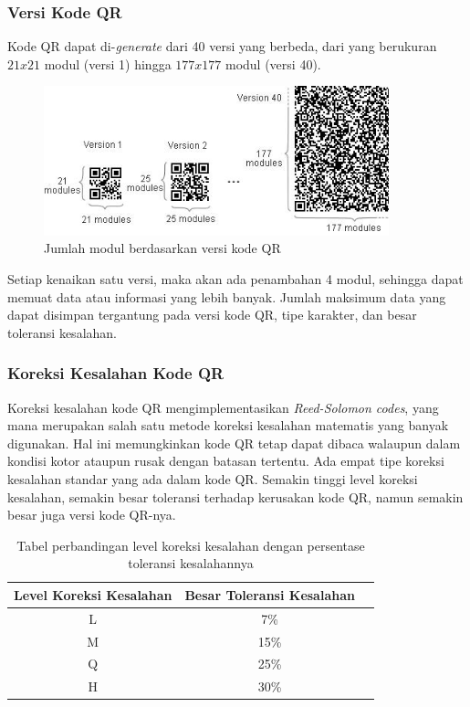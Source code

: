 \subsubsection{Versi Kode QR}
Kode QR dapat di-\emph{generate} dari 40 versi yang berbeda, dari yang berukuran $21x21$ modul (versi 1) hingga $177x177$ modul (versi 40).

\begin{figure}[h]
	\centering
	\includegraphics[width=10cm]{contents/chapter-2/2-versiqr.jpg}
	\caption{Jumlah modul berdasarkan versi kode QR}
	\label{Fig: 2-versiqr}
\end{figure}

Setiap kenaikan satu versi, maka akan ada penambahan 4 modul, sehingga dapat memuat data atau informasi yang lebih banyak. Jumlah maksimum data yang dapat disimpan tergantung pada versi kode QR, tipe karakter, dan besar toleransi kesalahan.

\subsubsection{Koreksi Kesalahan Kode QR}
Koreksi kesalahan kode QR mengimplementasikan \emph{Reed-Solomon codes}, yang mana merupakan salah satu metode koreksi kesalahan matematis yang banyak digunakan. Hal ini memungkinkan kode QR tetap dapat dibaca walaupun dalam kondisi kotor ataupun rusak dengan batasan tertentu. Ada empat tipe koreksi kesalahan standar yang ada dalam kode QR. Semakin tinggi level koreksi kesalahan, semakin besar toleransi terhadap kerusakan kode QR, namun semakin besar juga versi kode QR-nya.

\begin{table}[h]
	\caption{Tabel perbandingan level koreksi kesalahan dengan persentase toleransi kesalahannya}
	\vspace{0.5em}
	\centering
	\begin{tabular}{|c|c|c|}
		\hline
		Level Koreksi Kesalahan & Besar Toleransi Kesalahan \\
		\hline
		L & 7\% \\
		M & 15\% \\
		Q & 25\% \\
		H & 30\% \\ \hline
	\end{tabular}
	\label{Tab: 2-tabelperbandinganlevelkoreksi}
\end{table}

